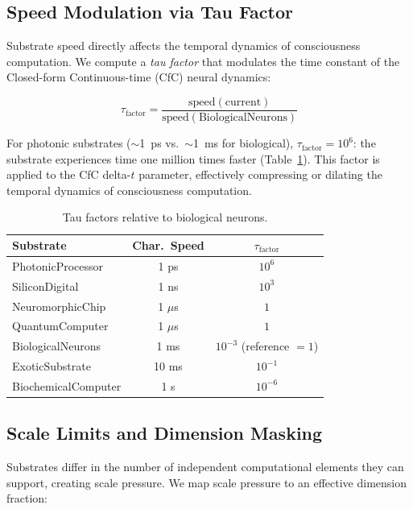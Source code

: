 \documentclass[12pt,a4paper]{article}
\begin{document}
\subsection{Speed Modulation via Tau Factor}

Substrate speed directly affects the temporal dynamics of consciousness computation. We compute a \emph{tau factor} that modulates the time constant of the Closed-form Continuous-time (CfC) neural dynamics:

\begin{equation}
\tau_{\text{factor}} = \frac{\text{speed}(\text{current})}{\text{speed}(\text{BiologicalNeurons})}
\end{equation}

For photonic substrates ($\sim$1~ps vs.\ $\sim$1~ms for biological), $\tau_{\text{factor}} = 10^6$: the substrate experiences time one million times faster (Table~\ref{tab:tau}). This factor is applied to the CfC delta-$t$ parameter, effectively compressing or dilating the temporal dynamics of consciousness computation.

\begin{table}[H]
\centering
\caption{Tau factors relative to biological neurons.}
\label{tab:tau}
\begin{tabular}{lcc}
\toprule
\textbf{Substrate} & \textbf{Char.\ Speed} & $\tau_{\text{factor}}$ \\
\midrule
PhotonicProcessor & 1 ps & $10^6$ \\
SiliconDigital & 1 ns & $10^3$ \\
NeuromorphicChip & 1 $\mu$s & $1$ \\
QuantumComputer & 1 $\mu$s & $1$ \\
BiologicalNeurons & 1 ms & $10^{-3}$ (reference $= 1$) \\
ExoticSubstrate & 10 ms & $10^{-1}$ \\
BiochemicalComputer & 1 s & $10^{-6}$ \\
\bottomrule
\end{tabular}
\end{table}

\subsection{Scale Limits and Dimension Masking}

Substrates differ in the number of independent computational elements they can support, creating scale pressure. We map scale pressure to an effective dimension fraction:
\end{document}
